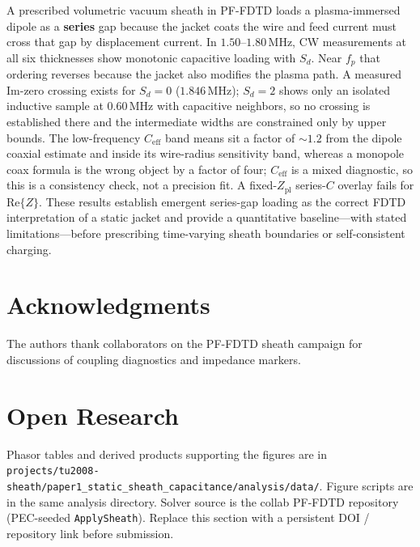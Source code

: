 \documentclass[draft]{agujournal2025}
\begin{document}
A prescribed volumetric vacuum sheath in PF-FDTD loads a plasma-immersed dipole as a \textbf{series} gap because the jacket coats the wire and feed current must cross that gap by displacement current. In \(1.50\)--\(1.80\,\mathrm{MHz}\), CW measurements at all six thicknesses show monotonic capacitive loading with \(S_d\). Near \(f_p\) that ordering reverses because the jacket also modifies the plasma path. A measured Im-zero crossing exists for \(S_d=0\) (\(1.846\,\mathrm{MHz}\)); \(S_d=2\) shows only an isolated inductive sample at \(0.60\,\mathrm{MHz}\) with capacitive neighbors, so no crossing is established there and the intermediate widths are constrained only by upper bounds. The low-frequency \(C_\mathrm{eff}\) band means sit a factor of \(\sim 1.2\) from the dipole coaxial estimate and inside its wire-radius sensitivity band, whereas a monopole coax formula is the wrong object by a factor of four; \(C_\mathrm{eff}\) is a mixed diagnostic, so this is a consistency check, not a precision fit. A fixed-\(Z_\mathrm{pl}\) series-\(C\) overlay fails for \(\mathrm{Re}\{Z\}\). These results establish emergent series-gap loading as the correct FDTD interpretation of a static jacket and provide a quantitative baseline---with stated limitations---before prescribing time-varying sheath boundaries or self-consistent charging.

\section*{Acknowledgments}
The authors thank collaborators on the PF-FDTD sheath campaign for discussions of coupling diagnostics and impedance markers.

\section*{Open Research}
Phasor tables and derived products supporting the figures are in \texttt{projects/tu2008-sheath/paper1\_static\_sheath\_capacitance/analysis/data/}. Figure scripts are in the same analysis directory. Solver source is the collab PF-FDTD repository (PEC-seeded \texttt{ApplySheath}). Replace this section with a persistent DOI / repository link before submission.


\end{document}
